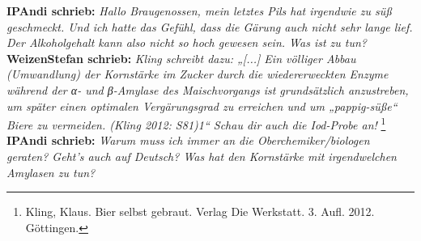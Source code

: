 \documentclass{scrartcl}  %
\begin{document}
{\selectfont  %
			\begin{tcolorbox}[enhanced,
				colback=white,
				colframe=teal,
				fonttitle=\sffamily\bfseries\large, 
				title=Neulich im Bierbrauer-Forum, 
				attach boxed title to top left={xshift=3.2mm,yshift=-0.50mm},
				boxed title style={skin=enhancedfirst jigsaw,size=small,arc=1mm,bottom=-1mm,colframe=teal,height=0.6cm},
				colbacktitle=teal,
				drop lifted shadow]
				
				\textbf{{\Large IPAndi schrieb:}} \textit{Hallo Braugenossen, mein letztes Pils hat irgendwie zu süß geschmeckt. Und ich hatte das Gefühl, dass die Gärung auch nicht sehr lange lief. Der Alkoholgehalt kann also nicht so hoch gewesen sein. Was ist zu tun?} \newline
				\textbf{{\Large WeizenStefan schrieb:}} \textit{Kling schreibt dazu: „[...] Ein völliger Abbau (Umwandlung) der Kornstärke im Zucker durch die wiedererweckten Enzyme während der α- und β-Amylase des Maischvorgangs ist grundsätzlich anzustreben, um später einen optimalen Vergärungsgrad zu erreichen und um „pappig-süße“ Biere zu vermeiden. (Kling 2012: S81)1“ Schau dir auch die Iod-Probe an!} \footnote{Kling, Klaus. Bier selbst gebraut. Verlag Die Werkstatt. 3. Aufl. 2012. Göttingen.} \newline
				\textbf{{\Large IPAndi schrieb:}} \textit{Warum muss ich immer an die Oberchemiker/biologen geraten? Geht's auch auf Deutsch? Was hat den Kornstärke mit irgendwelchen Amylasen zu tun?}
			\end{tcolorbox}
}  %
		
\end{document}
